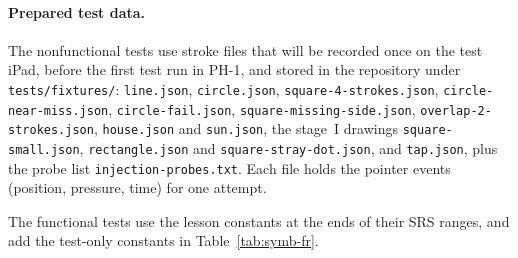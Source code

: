 \documentclass[12pt, titlepage]{article}
\begin{document}
\paragraph{Prepared test data.} The nonfunctional tests use stroke files
that will be recorded once on the test iPad, before the first test run
in PH-1, and stored in the repository under \texttt{tests/fixtures/}: \texttt{line.json}, \texttt{circle.json},
\texttt{square-\allowbreak{}4-\allowbreak{}strokes.json}, \texttt{circle-\allowbreak{}near-\allowbreak{}miss.json},
\texttt{circle-\allowbreak{}fail.json}, \texttt{square-\allowbreak{}missing-\allowbreak{}side.json},
\texttt{overlap-\allowbreak{}2-\allowbreak{}strokes.json}, \texttt{house.json} and \texttt{sun.json},
the stage~I drawings \texttt{square-\allowbreak{}small.json},
\texttt{rectangle.json} and \texttt{square-\allowbreak{}stray-\allowbreak{}dot.json},
and \texttt{tap.json},
plus the probe list \texttt{injection-\allowbreak{}probes.txt}. Each file holds the
pointer events (position, pressure, time) for one attempt.

The functional tests use the lesson constants at the ends of their SRS
ranges, and add the test-only constants in Table~\ref{tab:symb-fr}.
\end{document}
